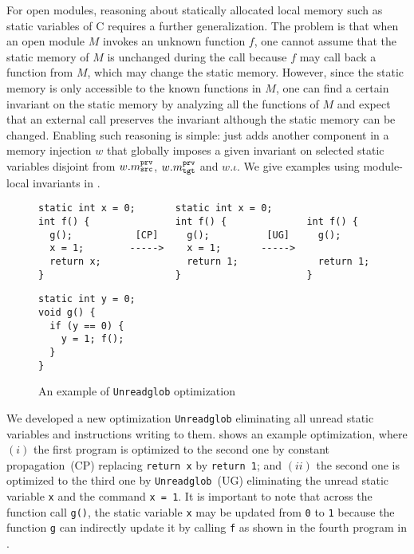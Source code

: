 

\label{sec:overview-verification:injection:static}
%
For open modules, reasoning about statically allocated local memory
such as static variables of C requires a further generalization.  The
problem is that when an open module $M$ invokes an unknown function
$f$, one cannot assume that the static memory of $M$ is unchanged
during the call because $f$ may call back a function from $M$, which
may change the static memory. However, since the static memory is only
accessible to the known functions in $M$, one can find a certain
invariant on the static memory by analyzing all the functions of $M$
and expect that an external call preserves the invariant although the
static memory can be changed. Enabling such reasoning is simple:
\ccm{} just adds another component in a memory injection $w$ that
globally imposes a given invariant on selected static variables
disjoint from $w.m^{\texttt{prv}}_{\texttt{src}}$, $w.m^{\texttt{prv}}_{\texttt{tgt}}$ and $w.\iota$.
We give examples using module-local invariants in .


\begin{figure}[t]
\begin{Verbatim}
static int x = 0;       static int x = 0;                   
int f() {               int f() {              int f() {    
  g();           [CP]     g();          [UG]     g();       
  x = 1;        ----->    x = 1;       ----->               
  return x;               return 1;              return 1;  
}                       }                      }            
\end{Verbatim}
\begin{Verbatim}
static int y = 0;
void g() {
  if (y == 0) {
    y = 1; f();
  }
}                 
\end{Verbatim}
\caption{An example of \texttt{Unreadglob} optimization}
\label{fig:overview-modulelocal:compiler}
\end{figure}

\label{sec:compiler:advanced:unreadglob}
We developed a new optimization \texttt{Unreadglob} eliminating all
unread static variables and instructions writing to them.
 shows an example
optimization, where $(i)$ the first program is optimized to the second
one by constant propagation~(CP) replacing \texttt{return x} by
\texttt{return 1}; and $(ii)$ the second one is optimized to the third
one by \texttt{Unreadglob}~(UG) eliminating the unread static variable
\texttt{x} and the command \texttt{x = 1}.  It is important to note
that across the function call \texttt{g()}, the static variable
\texttt{x} may be updated from \texttt{0} to \texttt{1} because the
function \texttt{g} can indirectly update it by calling \texttt{f} as shown in
the fourth program in .

